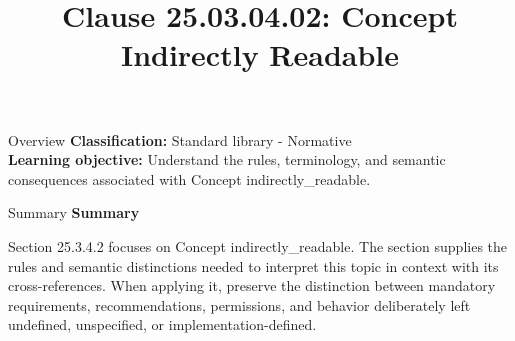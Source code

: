 \documentclass[10pt,letterpaper]{article}
\title{Clause 25.03.04.02: Concept Indirectly Readable}
\author{}
\date{}
\begin{document}
\maketitle
\begin{CornellOverviewBox}{Overview}
\textbf{Classification:} Standard library - Normative\\[2pt]
\textbf{Learning objective:} Understand the rules, terminology, and semantic consequences associated with Concept indirectly\_readable.
\end{CornellOverviewBox}\begin{CornellSummaryBox}{Summary}
{\sffamily\bfseries\color{Accent} Summary}\par\vspace{3pt}Section 25.3.4.2 focuses on Concept indirectly\_readable. The section supplies the rules and semantic distinctions needed to interpret this topic in context with its cross-references. When applying it, preserve the distinction between mandatory requirements, recommendations, permissions, and behavior deliberately left undefined, unspecified, or implementation-defined.
\end{CornellSummaryBox}
\end{document}
